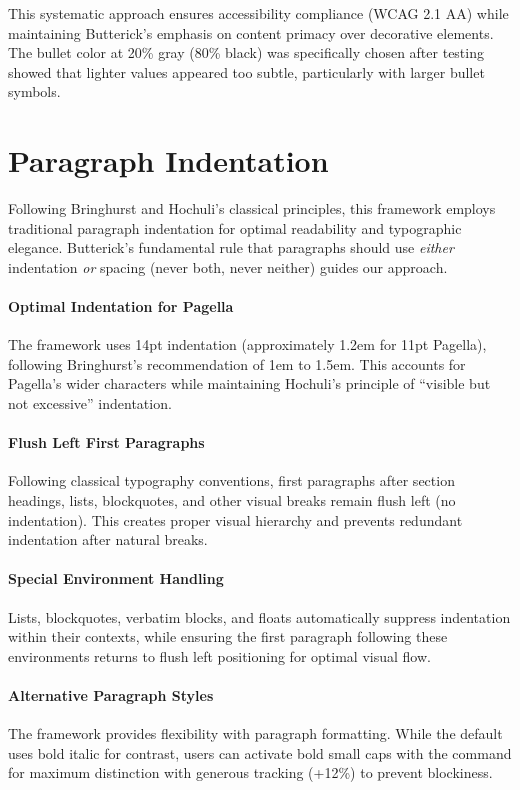 \documentclass[11pt]{article}
\begin{document}
This systematic approach ensures accessibility compliance (WCAG 2.1 AA) while maintaining Butterick's emphasis on content primacy over decorative elements. The bullet color at 20\% gray (80\% black) was specifically chosen after testing showed that lighter values appeared too subtle, particularly with larger bullet symbols.

\section{Paragraph Indentation}

Following Bringhurst and Hochuli's classical principles, this framework employs traditional paragraph indentation for optimal readability and typographic elegance. Butterick's fundamental rule that paragraphs should use \emph{either} indentation \emph{or} spacing (never both, never neither) guides our approach.

\paragraph{Optimal Indentation for Pagella} The framework uses 14pt indentation (approximately 1.2em for 11pt Pagella), following Bringhurst's recommendation of 1em to 1.5em. This accounts for Pagella's wider characters while maintaining Hochuli's principle of ``visible but not excessive'' indentation.

\paragraph{Flush Left First Paragraphs} Following classical typography conventions, first paragraphs after section headings, lists, blockquotes, and other visual breaks remain flush left (no indentation). This creates proper visual hierarchy and prevents redundant indentation after natural breaks.

\paragraph{Special Environment Handling} Lists, blockquotes, verbatim blocks, and floats automatically suppress indentation within their contexts, while ensuring the first paragraph following these environments returns to flush left positioning for optimal visual flow.

\paragraph{Alternative Paragraph Styles} The framework provides flexibility with paragraph formatting. While the default uses bold italic for contrast, users can activate bold small caps with the  command for maximum distinction with generous tracking (+12\%) to prevent blockiness.
\end{document}
